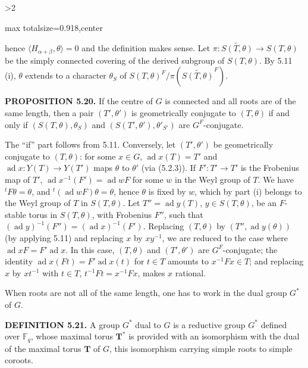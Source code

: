 \documentclass[9pt,twoside]{extarticle}
\newcommand{\EditionPage}[3]{%
  \ifnum#1>2\clearpage\fi
  \pdfbookmark[1]{Printed page #2}{en-folio-#2}%
  \hypertarget{en-physical-#1}{}%
  \noindent\begin{adjustbox}{max totalsize={\textwidth}{0.918\textheight},center}
  \begin{minipage}[t]{\textwidth}
  \fontsize{9.4}{11.1}\selectfont\justifying
  #3
  \end{minipage}
  \end{adjustbox}%
}
\begin{document}
\EditionPage{32}{133}{%
hence \(\langle H_{\alpha+\beta},\theta\rangle=0\) and the definition makes sense. Let \(\pi:\widetilde{S(T,\theta)}\to S(T,\theta)\) be the simply connected covering of the derived subgroup of \(S(T,\theta)\). By 5.11 (i), \(\theta\) extends to a character \(\theta_S\) of \(S(T,\theta)^F/\pi(\widetilde{S(T,\theta)}^F)\).\par

\noindent\textbf{PROPOSITION 5.20.} If the centre of \(G\) is connected and all roots are of the same length, then a pair \((T',\theta')\) is geometrically conjugate to \((T,\theta)\) if and only if \((S(T,\theta),\theta_S)\) and \((S(T',\theta'),\theta'_{S'})\) are \(G^F\)-conjugate.\par

The “if” part follows from 5.11. Conversely, let \((T',\theta')\) be geometrically conjugate to \((T,\theta)\): for some \(x\in G\), \(\operatorname{ad}x(T)=T'\) and \(\operatorname{ad}x:Y(T)\to Y(T')\) maps \(\theta\) to \(\theta'\) (via (5.2.3)). If \(F':T'\to T'\) is the Frobenius map of \(T'\), \(\operatorname{ad}x^{-1}(F')=\operatorname{ad}wF\) for some \(w\) in the Weyl group of \(T\). We have \({}^tF\theta=\theta\), and \({}^t(\operatorname{ad}wF)\theta=\theta\), hence \(\theta\) is fixed by \(w\), which by part (i) belongs to the Weyl group of \(T\) in \(S(T,\theta)\). Let \(T''=\operatorname{ad}y(T)\), \(y\in S(T,\theta)\), be an \(F\)-stable torus in \(S(T,\theta)\), with Frobenius \(F''\), such that \((\operatorname{ad}y)^{-1}(F'')=(\operatorname{ad}x)^{-1}(F')\). Replacing \((T,\theta)\) by \((T'',\operatorname{ad}y(\theta))\) (by applying 5.11) and replacing \(x\) by \(xy^{-1}\), we are reduced to the case where \(\operatorname{ad}xF=F'\operatorname{ad}x\). In this case, \((T,\theta)\) and \((T',\theta')\) are \(G^F\)-conjugate; the identity \(\operatorname{ad}x(Ft)=F'\operatorname{ad}x(t)\) for \(t\in T\) amounts to \(x^{-1}Fx\in T\); and replacing \(x\) by \(xt^{-1}\) with \(t\in T\), \(t^{-1}Ft=x^{-1}Fx\), makes \(x\) rational.\par

When roots are not all of the same length, one has to work in the dual group \(G^*\) of \(G\).\par

\noindent\textbf{DEFINITION 5.21.} A group \(G^*\) dual to \(G\) is a reductive group \(G^*\) defined over \(\mathbb F_q\), whose maximal torus \(\mathbf T^*\) is provided with an isomorphism with the dual of the maximal torus \(\mathbf T\) of \(G\), this isomorphism carrying simple roots to simple coroots.\par

}
\end{document}
